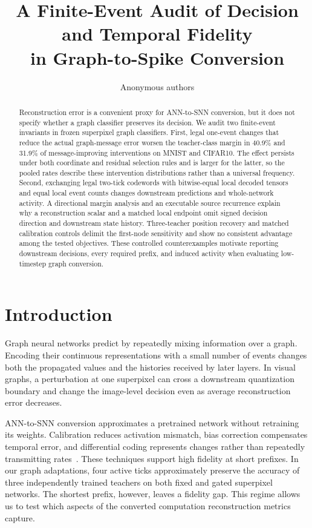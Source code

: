 \documentclass[10pt,twocolumn,letterpaper]{article}
\title{A Finite-Event Audit of Decision and Temporal Fidelity\\in Graph-to-Spike Conversion}
\author{Anonymous authors}
\begin{document}
\maketitle
\begin{abstract}
Reconstruction error is a convenient proxy for ANN-to-SNN conversion, but it does not specify whether a graph classifier preserves its decision. We audit two finite-event invariants in frozen superpixel graph classifiers. First, legal one-event changes that reduce the actual graph-message error worsen the teacher-class margin in 40.9\% and 31.9\% of message-improving interventions on MNIST and CIFAR10. The effect persists under both coordinate and residual selection rules and is larger for the latter, so the pooled rates describe these intervention distributions rather than a universal frequency. Second, exchanging legal two-tick codewords with bitwise-equal local decoded tensors and equal local event counts changes downstream predictions and whole-network activity. A directional margin analysis and an executable source recurrence explain why a reconstruction scalar and a matched local endpoint omit signed decision direction and downstream state history. Three-teacher position recovery and matched calibration controls delimit the first-node sensitivity and show no consistent advantage among the tested objectives. These controlled counterexamples motivate reporting downstream decisions, every required prefix, and induced activity when evaluating low-timestep graph conversion.
\end{abstract}

\section{Introduction}
Graph neural networks predict by repeatedly mixing information over a graph. Encoding their continuous representations with a small number of events changes both the propagated values and the histories received by later layers. In visual graphs, a perturbation at one superpixel can cross a downstream quantization boundary and change the image-level decision even as average reconstruction error decreases.

ANN-to-SNN conversion approximates a pretrained network without retraining its weights. Calibration reduces activation mismatch, bias correction compensates temporal error, and differential coding represents changes rather than repeatedly transmitting rates~\cite{li2021,wu2024ftbc,huang2025}. These techniques support high fidelity at short prefixes. In our graph adaptations, four active ticks approximately preserve the accuracy of three independently trained teachers on both fixed and gated superpixel networks. The shortest prefix, however, leaves a fidelity gap. This regime allows us to test which aspects of the converted computation reconstruction metrics capture.
\end{document}
